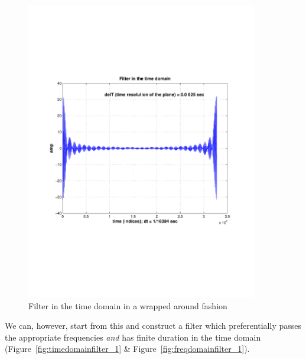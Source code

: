 \begin{figure}
\begin{center}
\includegraphics[width=0.9\textwidth]{figures/timedomainfilter}
\caption{Filter in the time domain in a wrapped around fashion}
\label{fig:timedomainfilter}
\end{center}
\end{figure}
 
We can, however, start from this and construct a filter which
preferentially passes the appropriate frequencies \emph{and} has finite
duration in the time domain (Figure~\ref{fig:timedomainfilter_1} \&
Figure~\ref{fig:freqdomainfilter_1}).

